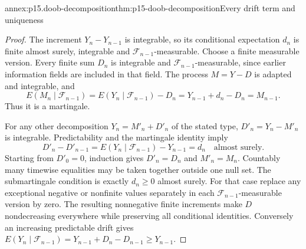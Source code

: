 
\begin{annexitem}{annex:p15.doob-decomposition}{thm:p15-doob-decomposition}{Every drift term and uniqueness}
\begin{proof}
The increment \(Y_n-Y_{n-1}\) is integrable, so its conditional
expectation \(d_n\) is finite almost surely, integrable and
\(\mathcal F_{n-1}\)-measurable. Choose a finite measurable version.
Every finite sum \(D_n\) is integrable and
\(\mathcal F_{n-1}\)-measurable, since earlier information fields
are included in that field. The process \(M=Y-D\) is adapted
and integrable, and
\[
 E(M_n\mid\mathcal F_{n-1})
       =E(Y_n\mid\mathcal F_{n-1})-D_n
       =Y_{n-1}+d_n-D_n=M_{n-1}.
\]
Thus it is a martingale.

For any other decomposition \(Y_n=M'_n+D'_n\) of the stated type,
\(D'_n=Y_n-M'_n\) is integrable. Predictability and the martingale
identity imply
\[
           D'_n-D'_{n-1}
               =E(Y_n\mid\mathcal F_{n-1})-Y_{n-1}=d_n
                                    \quad\text{almost surely}.
\]
Starting from \(D'_0=0\), induction gives \(D'_n=D_n\) and
\(M'_n=M_n\). Countably many timewise equalities may be taken
together outside one null set.
The submartingale condition is exactly \(d_n\geq0\) almost surely.
For that case replace any exceptional negative or nonfinite
values separately in each \(\mathcal F_{n-1}\)-measurable version
by zero. The resulting nonnegative finite increments make \(D\)
nondecreasing everywhere while preserving all conditional identities.
Conversely an increasing predictable drift gives
\(E(Y_n\mid\mathcal F_{n-1})=Y_{n-1}+D_n-D_{n-1}\geq Y_{n-1}\).
\end{proof}
\end{annexitem}


